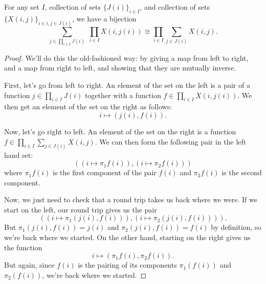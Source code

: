 \documentclass[Book-Poly]{subfiles}
\begin{document}
\begin{proposition}\label{prop.push_prod_sum_set}
For any set $I$, collection of sets $\{J(i)\}_{i\in I}$, and collection of sets $\{X(i,j)\}_{i\in i, j\in J(i)}$, we have a bijection
\begin{equation}\label{eqn.set_completely_distributive}
\sum_{j\in \prod_{i\in I}J(i)}\;\prod_{i\in I}X(i,j(i))
\cong
\prod_{i\in I}\sum_{j\in J(i)}X(i,j).
\end{equation}
\end{proposition}
\begin{proof}
We'll do this the old-fashioned way: by giving a map from left to right, and a
map from right to left, and showing that they are mutually inverse. 

First, let's go from left to right. An element of the set on the left is a pair
of a function $j \in \prod_{i \in I}J(i)$ together with a function $f \in
\prod_{i \in I} X(i, j(i))$. We then get an element of the set on the right as follows:
\[i \mapsto (j(i), f(i)).\]

Now, let's go right to left. An element of the set on the right is a function $f
\in \prod_{i \in I} \sum_{j \in J(i)} X(i, j)$. We can then form the following
pair in the left hand set:
\[((i \mapsto \pi_1f(i)), (i \mapsto \pi_2f(i)))\]
where $\pi_1f(i)$ is the first component of the pair $f(i)$ and $\pi_2f(i)$
is the second component.

Now, we just need to check that a round trip takes us back where we were. If we
start on the left, our round trip gives us the pair
\[((i \mapsto \pi_1(j(i), f(i))), (i \mapsto \pi_2(j(i), f(i)))).\]
But $\pi_1(j(i), f(i)) = j(i)$ and $\pi_2(j(i), f(i)) = f(i)$ by definition, so
we're back where we started. On the other hand, starting on the right gives us
the function
\[i \mapsto (\pi_1f(i), \pi_2f(i)).\]
But again, since $f(i)$ is the pairing of its components $\pi_1(f(i))$ and
$\pi_2(f(i))$, we're back where we started.

\end{proof}
\end{document}
